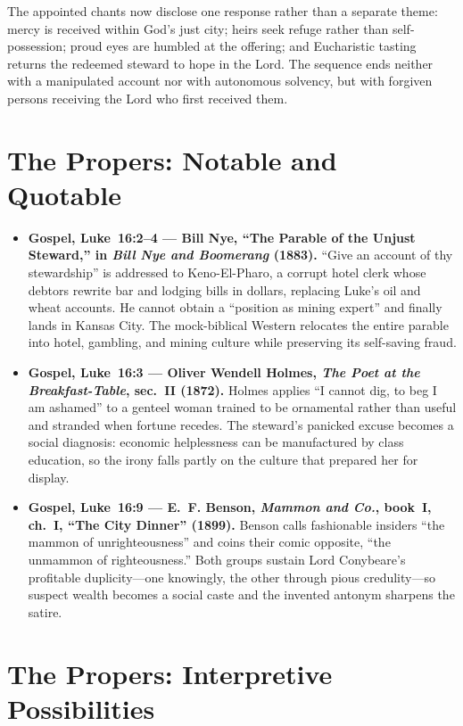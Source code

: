 \begin{deepstudy}
The appointed chants now disclose one response rather than a separate theme: mercy is received within God's just city; heirs seek refuge rather than self-possession; proud eyes are humbled at the offering; and Eucharistic tasting returns the redeemed steward to hope in the Lord. The sequence ends neither with a manipulated account nor with autonomous solvency, but with forgiven persons receiving the Lord who first received them.

\sectionguard
\section*{The Propers: Notable and Quotable}

{\small
\begin{itemize}[itemsep=0.35em,topsep=0.2em,parsep=0pt]
\item \textbf{Gospel, Luke~16:2--4 --- Bill Nye, ``The Parable of the Unjust Steward,'' in \emph{Bill Nye and Boomerang} (1883).} ``Give an account of thy stewardship'' is addressed to Keno-El-Pharo, a corrupt hotel clerk whose debtors rewrite bar and lodging bills in dollars, replacing Luke's oil and wheat accounts. He cannot obtain a ``position as mining expert'' and finally lands in Kansas City. The mock-biblical Western relocates the entire parable into hotel, gambling, and mining culture while preserving its self-saving fraud.

\item \textbf{Gospel, Luke~16:3 --- Oliver Wendell Holmes, \emph{The Poet at the Breakfast-Table}, sec.~II (1872).} Holmes applies ``I cannot dig, to beg I am ashamed'' to a genteel woman trained to be ornamental rather than useful and stranded when fortune recedes. The steward's panicked excuse becomes a social diagnosis: economic helplessness can be manufactured by class education, so the irony falls partly on the culture that prepared her for display.

\item \textbf{Gospel, Luke~16:9 --- E.~F. Benson, \emph{Mammon and Co.}, book~I, ch.~I, ``The City Dinner'' (1899).} Benson calls fashionable insiders ``the mammon of unrighteousness'' and coins their comic opposite, ``the unmammon of righteousness.'' Both groups sustain Lord Conybeare's profitable duplicity---one knowingly, the other through pious credulity---so suspect wealth becomes a social caste and the invented antonym sharpens the satire.
\end{itemize}
}

\sectionguard
\section*{The Propers: Interpretive Possibilities}


\end{deepstudy}
